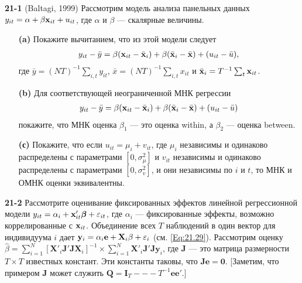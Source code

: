 \textbf{21-1} (Baltagi, 1999) Рассмотрим модель анализа панельных данных $y_{it}=\alpha + \beta \mathbf{x}_{it}+u_{it}$, где $\alpha$ и $\beta$ --- скалярные величины.
\begin{itemize}
\item[{\bf (a)}] Покажите вычитанием, что из этой модели следует
 \begin{align}
y_{it}-\bar{y}=\beta(\mathbf{x}_{it}-\bar{\mathbf{x}}_i) + \beta(\bar{\mathbf{x}}_{i}-\bar{\mathbf{x}}) + (u_{it}-\bar{u}),
\nonumber
\end{align}
где $\bar{y}=(NT)^{-1}\sum_{i,t} y_{it}$, $\bar{x}=(NT)^{-1}\sum_{i,t} x_{it}$ и $\bar{\mathbf{x}}_i=T^{-1}\sum_t\mathbf{x}_{it}$.

\item[{\bf (b)}] Для соответствующей неограниченной  МНК регрессии
\begin{align}
y_{it}-\bar{y}=\beta(\mathbf{x}_{it}-\bar{\mathbf{x}}_i) + \beta(\bar{\mathbf{x}}_{i}-\bar{\mathbf{x}}) + (u_{it}-\bar{u})
\nonumber
\end{align}
покажите, что МНК оценка $\beta_1$ --- это оценка within, а $\beta_2$ --- оценка between.

\item[{\bf (с)}] Покажите, что если $u_{it}=\mu_i+v_{it}$, где $\mu_i$ независимы и одинаково распределены с параметрами $[0,\sigma^2_\mu]$ и $v_{it}$ независимы и одинаково распределены с параметрами $[0,\sigma^2_v]$, и они независимы по  $i$ и $t$, то МНК и ОМНК оценки эквивалентны.
\end{itemize}

\textbf{21-2} Рассмотрите оценивание фиксированных эффектов линейной регрессионной модели $y_{it}=\alpha_i+\mathbf{x}'_{it}\bm\beta+\varepsilon_{it}$, где $\alpha_i$ --- фиксированные эффекты, возможно коррелированные с $\mathbf{x}_{it}$. Объединение всех  $T$ наблюдений в один вектор для индивидуума $i$ дает $\mathbf y_i=\alpha_i \mathbf e + \mathbf X_i \beta + \varepsilon_i$ (см. \ref{Eq:21.29}). Рассмотрим оценку $\hat{\beta}=\sum^N_{i=1}[ \mathbf X'_i \mathbf J' \mathbf J \mathbf X_i]^{-1} \times \sum^N_{i=1}\mathbf X'_i \mathbf J' \mathbf J \mathbf y_i$, где $\mathbf J$ --- это матрица размерности $T \times T$ известных констант. Эти константы таковы, что $\mathbf J \mathbf e =\mathbf 0$. [Заметим, что примером $\mathbf J$ может служить $\mathbf Q = \mathbf I_T --- T^{-1} \mathbf e \mathbf e'$.]


